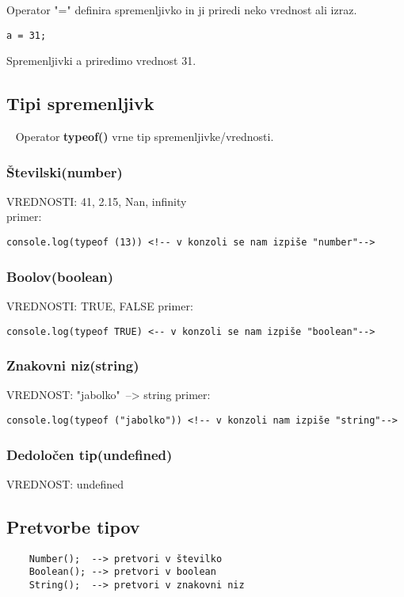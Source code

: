 Operator "=" definira spremenljivko in ji priredi neko vrednost ali izraz.

\texttt{a = 31;}

Spremenljivki a priredimo vrednost 31.\\

\subsection{Tipi spremenljivk}\
\newline
Operator \textbf{typeof()} vrne tip spremenljivke/vrednosti.\


\subsubsection*{Številski(number)}
VREDNOSTI: 41, 2.15, Nan, infinity\\
primer:
\begin{verbatim}
console.log(typeof (13)) <!-- v konzoli se nam izpiše "number"-->
\end{verbatim}

\subsubsection*{Boolov(boolean)}
VREDNOSTI: TRUE, FALSE
primer:
\begin{verbatim}
console.log(typeof TRUE) <-- v konzoli se nam izpiše "boolean"-->
\end{verbatim}

\subsubsection*{Znakovni niz(string)}
VREDNOST: "jabolko"\ --> string
primer:
\begin{verbatim}
console.log(typeof ("jabolko")) <!-- v konzoli nam izpiše "string"-->
\end{verbatim}

\subsubsection*{Dedoločen tip(undefined)}
VREDNOST: undefined

\subsection{Pretvorbe tipov}

\begin{verbatim}
	Number();  --> pretvori v številko
	Boolean(); --> pretvori v boolean
	String();  --> pretvori v znakovni niz
\end{verbatim}
